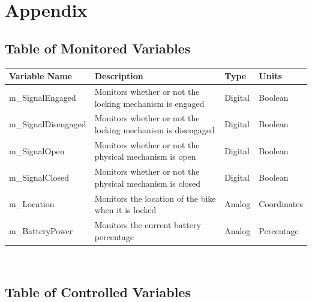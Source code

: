 \documentclass[12pt]{article}
\begin{document}
\newpage{}
\section*{Appendix}

\subsection{Table of Monitored Variables}

\begin{minipage}{\textwidth}
\renewcommand*{\arraystretch}{1.5}
\begin{tabular}{| p{} | p{} | p{} | p{} |}
 \hline
 Variable Name & Description & Type & Units \\ 
 \hline
 m\_SignalEngaged & Monitors whether or not the locking mechanism is engaged & Digital & Boolean \\ 
  \hline
 m\_SignalDisengaged & Monitors whether or not the locking mechanism is disengaged & Digital & Boolean \\ 
  \hline
 m\_SignalOpen & Monitors whether or not the physical mechanism is open & Digital & Boolean \\ 
  \hline
 m\_SignalClosed& Monitors whether or not the physical mechanism is closed & Digital & Boolean \\ 
  \hline
 m\_Location & Monitors the location of the bike when it is locked & Analog & Coordinates \\ 
  \hline
 m\_BatteryPower & Monitors the current battery percentage & Analog & Percentage \\ 
 \hline
\end{tabular}
\end{minipage}\\

\subsection{Table of Controlled Variables}
\end{document}
